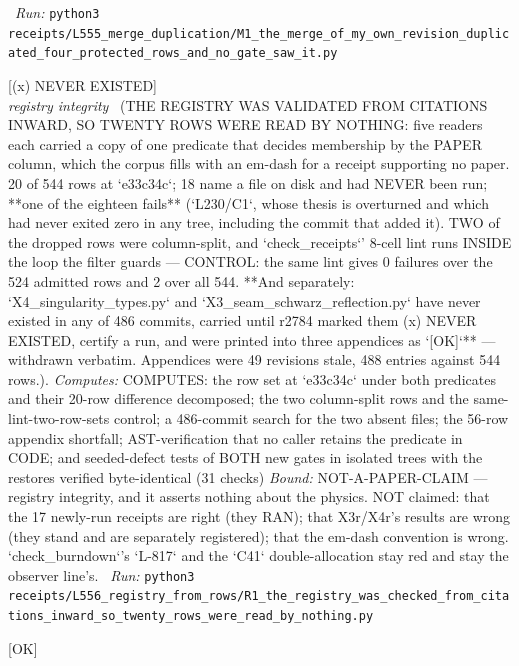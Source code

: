 \begin{description}
\ \emph{Run:} \texttt{python3 receipts/L555\_merge\_duplication/M1\_the\_merge\_of\_my\_own\_revision\_duplicated\_four\_protected\_rows\_and\_no\_gate\_saw\_it.py}
\item[\label{rcpt:R1_the_registry_was_checked_from_citations_inward_so_twenty_rows_were_read_by_nothing}\texttt{R1\_the\_registry\_was\_checked\_from\_citations\_inward\_so\_twenty\_rows\_were\_read\_by\_nothing}]\hfill\textsf{[(x) NEVER EXISTED]}\\
\textit{registry integrity} \ (THE REGISTRY WAS VALIDATED FROM CITATIONS INWARD, SO TWENTY ROWS WERE READ BY NOTHING: five readers each carried a copy of one predicate that decides membership by the PAPER column, which the corpus fills with an em-dash for a receipt supporting no paper. 20 of 544 rows at `e33c34c`; 18 name a file on disk and had NEVER been run; **one of the eighteen fails** (`L230/C1`, whose thesis is overturned and which had never exited zero in any tree, including the commit that added it). TWO of the dropped rows were column-split, and `check\_receipts`' 8-cell lint runs INSIDE the loop the filter guards --- CONTROL: the same lint gives 0 failures over the 524 admitted rows and 2 over all 544. **And separately: `X4\_singularity\_types.py` and `X3\_seam\_schwarz\_reflection.py` have never existed in any of 486 commits, carried  until r2784 marked them (x) NEVER EXISTED, certify a run, and were printed into three appendices as `[OK]`** --- withdrawn verbatim. Appendices were 49 revisions stale, 488 entries against 544 rows.). 
\emph{Computes:} COMPUTES: the row set at `e33c34c` under both predicates and their 20-row difference decomposed; the two column-split rows and the same-lint-two-row-sets control; a 486-commit search for the two absent files; the 56-row appendix shortfall; AST-verification that no caller retains the predicate in CODE; and seeded-defect tests of BOTH new gates in isolated trees with the restores verified byte-identical (31 checks)
 \emph{Bound:} NOT-A-PAPER-CLAIM --- registry integrity, and it asserts nothing about the physics. NOT claimed: that the 17 newly-run receipts are right (they RAN); that X3r/X4r's results are wrong (they stand and are separately registered); that the em-dash convention is wrong. `check\_burndown`'s `L-817` and the `C41` double-allocation stay red and stay the observer line's.
\ \emph{Run:} \texttt{python3 receipts/L556\_registry\_from\_rows/R1\_the\_registry\_was\_checked\_from\_citations\_inward\_so\_twenty\_rows\_were\_read\_by\_nothing.py}
\item[\label{rcpt:B43_the_two_sides_of_the_wall_differ_in_signature}\texttt{B43\_the\_two\_sides\_of\_the\_wall\_differ\_in\_signature}]\hfill\textsf{[OK]}\\

\end{description}
